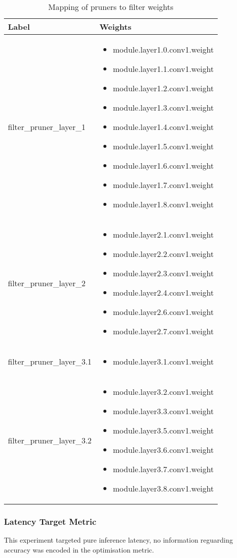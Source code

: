 \documentclass[../Dissertation.tex]{subfiles}
\begin{document}
\begin{table}[H]
    \centering
    \setlength{\extrarowheight}{3pt}
    \setlength{\tabcolsep}{3pt}
    \label{my-label}
    \begin{tabularx}{0.6\textwidth}{|p{40mm}|*{1}{>{\compress\RaggedRight\arraybackslash} X |}}
    \hline
    Label & Weights  \\
    \hline
    filter\_pruner\_layer\_1
    & \begin{itemize}
        \item module.layer1.0.conv1.weight
        \item module.layer1.1.conv1.weight
        \item module.layer1.2.conv1.weight
        \item module.layer1.3.conv1.weight
        \item module.layer1.4.conv1.weight
        \item module.layer1.5.conv1.weight
        \item module.layer1.6.conv1.weight
        \item module.layer1.7.conv1.weight
        \item module.layer1.8.conv1.weight
    \end{itemize} \\ 
    \hline
    filter\_pruner\_layer\_2 
    & \begin{itemize}
        \item module.layer2.1.conv1.weight
        \item module.layer2.2.conv1.weight
        \item module.layer2.3.conv1.weight
        \item module.layer2.4.conv1.weight
        \item module.layer2.6.conv1.weight
        \item module.layer2.7.conv1.weight
    \end{itemize} \\ 
    \hline
    filter\_pruner\_layer\_3.1
    & \begin{itemize}
        \item module.layer3.1.conv1.weight
    \end{itemize} \\
    \hline
    filter\_pruner\_layer\_3.2
    & \begin{itemize}
        \item module.layer3.2.conv1.weight
        \item module.layer3.3.conv1.weight
        \item module.layer3.5.conv1.weight
        \item module.layer3.6.conv1.weight
        \item module.layer3.7.conv1.weight
        \item module.layer3.8.conv1.weight
    \end{itemize}\\ \hline
    \end{tabularx}
    \caption{Mapping of pruners to filter weights}
\end{table}

\subsubsection{Latency Target Metric}
This experiment targeted pure inference latency, no information reguarding accuracy was encoded in the optimisation metric. 
\end{document}
